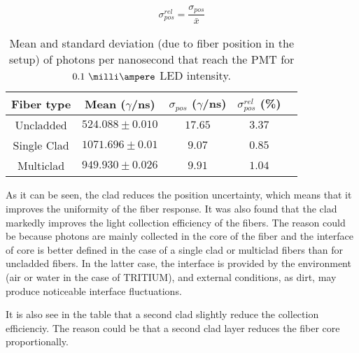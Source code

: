 \begin{equation}
\sigma^{rel}_{pos} = \frac{\sigma_{pos}}{\bar{x}}
\label{eq:RelativeStandardDesviation}
\end{equation}

\begin{table}[htbp]
\begin{center}
\begin{tabular}{|c|c|c|c|c|}
\hline
Fiber type & Mean ($\gamma$/ns) & $\sigma_{pos}$ ($\gamma$/ns) & $\sigma^{rel}_{pos}$ (\%)\\
\hline \hline \hline
Uncladded & $524.088 \pm 0.010$ & $17.65$ & $3.37$ \\ \hline
Single Clad & $1071.696 \pm 0.01$ & $9.07$ & $0.85$ \\ \hline
Multiclad & $949.930 \pm 0.026$ & $9.91$ & $1.04$ \\ \hline
\end{tabular}
\caption{Mean and standard deviation (due to fiber position in the setup) of photons per nanosecond that reach the PMT for $0.1~\milli\ampere$ LED intensity.}
\label{tab:PositionStandardDeviation}
\end{center}
\end{table}

As it can be seen, the clad reduces the position uncertainty, which means that it improves the uniformity of the fiber response. It was also found that the clad markedly improves the light collection efficiency of the fibers. The reason could be because photons are mainly collected in the core of the fiber and the interface of core is better defined in the case of a single clad or multiclad fibers than for uncladded fibers. In the latter case, the interface is provided by the environment (air or water in the case of TRITIUM), and external conditions, as dirt, may produce noticeable interface fluctuations.

It is also see in the table that a second clad slightly reduce the collection efficienciy. The reason could be that a second clad layer reduces the fiber core proportionally.



